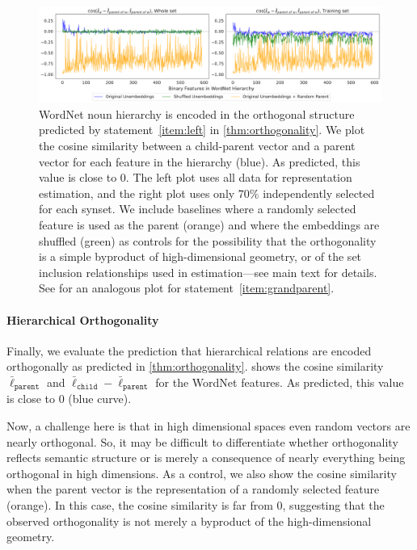 \documentclass{article}
\newcommand{\ConceptValue}[1]{\texttt{#1}}
\begin{document}
\begin{figure}[t]
  \centering
  \includegraphics[width=1.0\linewidth]{figures/hier_ortho_b_noun_gemma.pdf}
  \caption{WordNet noun hierarchy is encoded in the orthogonal structure predicted by statement~\ref{item:left} in \cref{thm:orthogonality}.
  We plot the cosine similarity between a child-parent vector and a parent vector for each feature in the hierarchy (blue). As predicted, this value is close to 0. The left plot uses all data for representation estimation, and the right plot uses only 70\% independently selected for each synset.
  We include baselines where a randomly selected feature is used as the parent (orange) and where the embeddings are shuffled (green) as controls for the possibility that the orthogonality is a simple byproduct of high-dimensional geometry, or of the set inclusion relationships used in estimation---see main text for details.
  See  for an analogous plot for statement~\ref{item:grandparent}.
  }
  \label{fig:hier_ortho_b_noun_gemma}
\end{figure}

\paragraph{Hierarchical Orthogonality}
Finally, we evaluate the prediction that hierarchical relations are encoded orthogonally as predicted in \cref{thm:orthogonality}.
 shows the cosine similarity $\bar\ell_{\ConceptValue{parent}}$ and $\bar\ell_{\ConceptValue{child}} - \bar\ell_{\ConceptValue{parent}}$ for the WordNet features. As predicted, this value is close to 0 (blue curve).

Now, a challenge here is that in high dimensional spaces even random vectors are nearly orthogonal. So, it may be difficult to differentiate whether orthogonality reflects semantic structure or is merely a consequence of nearly everything being orthogonal in high dimensions. As a control, we also show the cosine similarity when the parent vector is the representation of a randomly selected feature (orange). In this case, the cosine similarity is far from 0, suggesting that the observed orthogonality is not merely a byproduct of the high-dimensional geometry.
\end{document}
